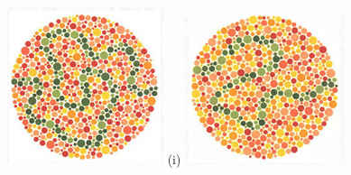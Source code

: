 \documentclass[	12pt, Times, openright, twoside, a4paper, english, brazil]{abntex2}
\begin{document}
\begin{apendicesenv}
\begin{figure}[!htb]
\centering
{\includegraphics[width=\linewidth]{ishihara-fuga/figureIshihara30.png}}
(i)
\endminipage\hfill
{}
\centering
{\includegraphics[width=\linewidth]{ishihara-fuga/figureIshihara31.png}}

\end{figure}
\end{apendicesenv}
\end{document}
